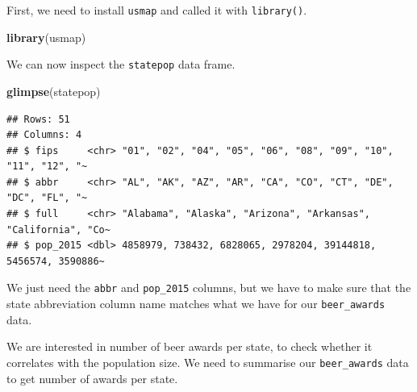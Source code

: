 \documentclass[
]{book}
\newenvironment{Shaded}{\begin{snugshade}}{\end{snugshade}}
\newcommand{\DecValTok}[1]{\textcolor[rgb]{0.00,0.00,0.81}{#1}}
\newcommand{\KeywordTok}[1]{\textcolor[rgb]{0.13,0.29,0.53}{\textbf{#1}}}
\newcommand{\NormalTok}[1]{#1}
\newcommand{\OperatorTok}[1]{\textcolor[rgb]{0.81,0.36,0.00}{\textbf{#1}}}
\newcommand{\StringTok}[1]{\textcolor[rgb]{0.31,0.60,0.02}{#1}}
\begin{document}
First, we need to install \texttt{usmap} and called it with \texttt{library()}.

\begin{Shaded}
\begin{Highlighting}[]
\KeywordTok{library}\NormalTok{(usmap)}
\end{Highlighting}
\end{Shaded}

We can now inspect the \texttt{statepop} data frame.

\begin{Shaded}
\begin{Highlighting}[]
\KeywordTok{glimpse}\NormalTok{(statepop)}
\end{Highlighting}
\end{Shaded}

\begin{verbatim}
## Rows: 51
## Columns: 4
## $ fips     <chr> "01", "02", "04", "05", "06", "08", "09", "10", "11", "12", "~
## $ abbr     <chr> "AL", "AK", "AZ", "AR", "CA", "CO", "CT", "DE", "DC", "FL", "~
## $ full     <chr> "Alabama", "Alaska", "Arizona", "Arkansas", "California", "Co~
## $ pop_2015 <dbl> 4858979, 738432, 6828065, 2978204, 39144818, 5456574, 3590886~
\end{verbatim}

We just need the \texttt{abbr} and \texttt{pop\_2015} columns, but we have to make sure that the state abbreviation column name matches what we have for our \texttt{beer\_awards} data.

\begin{Shaded}
\end{Shaded}

We are interested in number of beer awards per state, to check whether it correlates with the population size. We need to summarise our \texttt{beer\_awards} data to get number of awards per state.

\begin{Shaded}
\end{Shaded}
\end{document}
